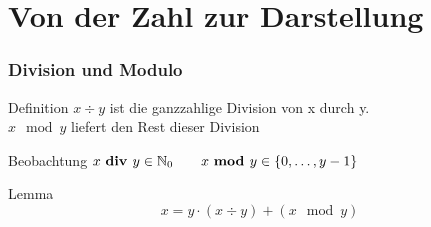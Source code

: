 %
%

\section{Von der Zahl zur Darstellung}
\begin{frame}
	\frametitle{Division und Modulo}
	\begin{block}{Definition}
		$ x \div y$ ist die ganzzahlige Division von x durch y.\\
		$ x \mod y$ liefert den Rest dieser Division
	\end{block} 
	\pause
	
	\begin{block}{Beobachtung}
		$ x\text{ \bf{div} } y \in \mathbb{N}_0 \qquad x\text{ \bf{mod} } y \in \{0,\dots, y-1\} $
	\end{block}
	\pause
	
	\begin{block}{Lemma}
		$$ x = y \cdot (x \div y ) + \left( x \mod y \right)$$ 
	\end{block}
	
\end{frame}

